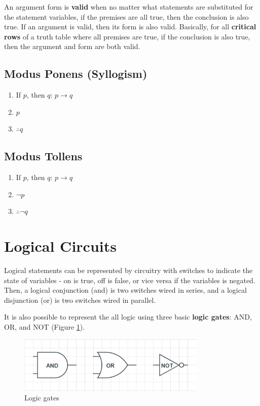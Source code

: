 \documentclass[11pt]{article}
\begin{document}
	An argument form is \textbf{valid} when no matter what statements are substituted for the statement variables, if the premises are all true, then the conclusion is also true. If an argument is valid, then its form is also valid. Basically, for all \textbf{critical rows} of a truth table where all premises are true, if the conclusion is also true, then the argument and form are both valid.\pagebreak
	
	\subsection{Modus Ponens (Syllogism)}
		
		\begin{enumerate}
			\item If $p$, then $q$: $p\rightarrow q$
			\item $p$
			\item $\therefore q$
		\end{enumerate}
		
	\subsection{Modus Tollens}
		
		\begin{enumerate}
			\item If $p$, then $q$: $p\rightarrow q$
			\item $\lnot p$
			\item $\therefore \lnot q$
		\end{enumerate}
	
\section{Logical Circuits}
	Logical statements can be represented by circuitry with switches to indicate the state of variables - on is true, off is false, or vice versa if the variables is negated. Then, a logical conjunction (and) is two switches wired in series, and a logical disjunction (or) is two switches wired in parallel.
	
	It is also possible to represent the all logic using three basic \textbf{logic gates}: AND, OR, and NOT (Figure \ref{fig:logicgate}).
	
	\begin{figure}[htb]
		\centering
		\includegraphics[width=0.8\textwidth]{logicgates.png}
		\caption{Logic gates}
		\label{fig:logicgate}
	\end{figure}	
	
\end{document}
